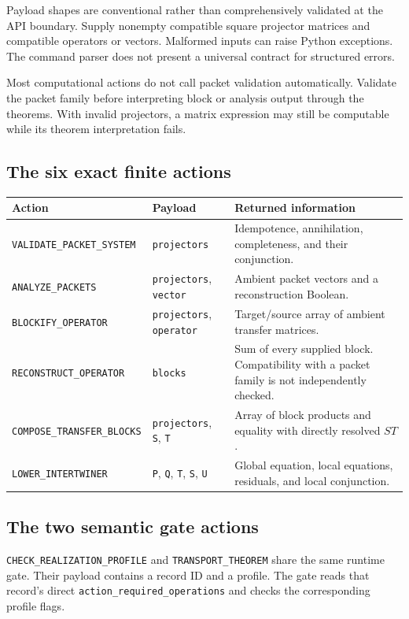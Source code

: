 \documentclass[a4paper,11pt]{article}
\begin{document}
Payload shapes are conventional rather than comprehensively validated at the API boundary. Supply nonempty compatible square projector matrices and compatible operators or vectors. Malformed inputs can raise Python exceptions. The command parser does not present a universal contract for structured errors.

Most computational actions do not call packet validation automatically. Validate the packet family before interpreting block or analysis output through the theorems. With invalid projectors, a matrix expression may still be computable while its theorem interpretation fails.
\subsection{The six exact finite actions}
\begin{longtable}{@{}p{}p{}p{}@{}}
\toprule Action & Payload & Returned information\\\midrule\endhead
\nolinkurl{VALIDATE_PACKET_SYSTEM} & \nolinkurl{projectors} & Idempotence, annihilation, completeness, and their conjunction.\\
\nolinkurl{ANALYZE_PACKETS} & \nolinkurl{projectors}, \nolinkurl{vector} & Ambient packet vectors and a reconstruction Boolean.\\
\nolinkurl{BLOCKIFY_OPERATOR} & \nolinkurl{projectors}, \nolinkurl{operator} & Target/source array of ambient transfer matrices.\\
\nolinkurl{RECONSTRUCT_OPERATOR} & \nolinkurl{blocks} & Sum of every supplied block. Compatibility with a packet family is not independently checked.\\
\nolinkurl{COMPOSE_TRANSFER_BLOCKS} & \nolinkurl{projectors}, \nolinkurl{S}, \nolinkurl{T} & Array of block products and equality with directly resolved $ST$.\\
\nolinkurl{LOWER_INTERTWINER} & \nolinkurl{P}, \nolinkurl{Q}, \nolinkurl{T}, \nolinkurl{S}, \nolinkurl{U} & Global equation, local equations, residuals, and local conjunction.\\\bottomrule
\end{longtable}
\subsection{The two semantic gate actions}
\nolinkurl{CHECK_REALIZATION_PROFILE} and \nolinkurl{TRANSPORT_THEOREM} share the same runtime gate. Their payload contains a record ID and a profile. The gate reads that record's direct \nolinkurl{action_required_operations} and checks the corresponding profile flags.
\end{document}
